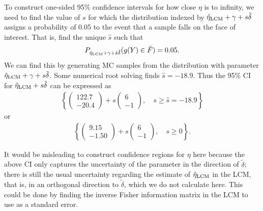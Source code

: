 To construct one-sided 95\% confidence intervals for how close $\eta$ is to
infinity, we need to find the value of 
$s$ for which the distribution indexed by $\hat{\eta}_{\textrm{LCM}} + \gamma + s \tilde{\delta}$ 
assigns a probability of 0.05 to the event that a sample falls on the 
face of interest.  That is, find the unique $\hat{s}$ such that
\begin{align*}
P_{\hat{\eta}_{\textrm{LCM}} + \gamma + \hat{s} \tilde{\delta}}(g(Y) \in \tilde{F} ) = 0.05.
\end{align*}
We can find this by generating MC samples from the distribution with parameter 
$\hat{\eta}_{\textrm{LCM}} + \gamma + s \tilde{\delta}$.  Some numerical root solving finds $\hat{s} = -18.9$.  
Thus the 95\% CI for $\hat{\eta}_{\textrm{LCM}} + s \tilde{\delta}$ can be expressed as
\begin{align*}
\left \{ \left(\begin{array}{c}122.7 \\-20.4\end{array}\right) + s \left(\begin{array}{r}6 \\-1\end{array}\right), 
\quad s \geq \hat{s} = -18.9 \right \}
\end{align*}
or 
\begin{align*}
\left \{ \left(\begin{array}{r}9.15 \\-1.50\end{array}\right) + s \left(\begin{array}{r}6 \\-1\end{array}\right), 
\quad s \geq 0 \right \}.
\end{align*}

It would be misleading to construct confidence regions for $\eta$ here because the above CI only captures the 
uncertainty of the parameter in the direction of $\tilde{\delta}$; there is still the usual 
uncertainty regarding the estimate of $\hat{\eta}_{\textrm{LCM}}$ in the LCM, that is, in an orthogonal 
direction to $\tilde{\delta}$, which we do not calculate here.  This could be done by finding the
inverse Fisher information matrix in the LCM to use as a standard error.


